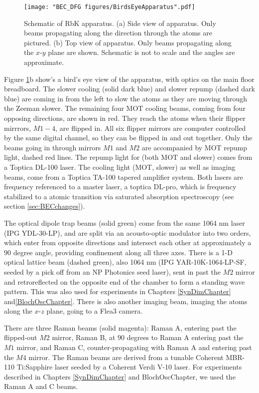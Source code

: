 \begin{figure}
	\texttt{[image: "BEC\_DFG figures/BirdsEyeApparatus".pdf]}
\caption[Schematic of RbK apparatus]{Schematic of RbK apparatus. (a) Side view of apparatus. Only beams propagating along the \ez{} direction through the atoms are pictured. (b) Top view of apparatus. Only beams propagating along the $x$-$y$ plane are shown. Schematic is not to scale and the angles are approximate.}
\label{fig:BirdsEyeApparatus}
\end{figure}

Figure \ref{fig:BirdsEyeApparatus}b show's a bird's eye view of the apparatus, with optics on the main floor breadboard. The slower cooling (solid dark blue) and slower repump (dashed dark blue) are coming in from the left to slow the atoms as they are moving through the Zeeman slower. The remaining four MOT cooling beams, coming from four opposing directions, are shown in red.  They reach the atoms when their flipper mirrrors, $M1-4$, are flipped in. All six flipper mirrors are computer controlled by the same digital channel, so they can be flipped in and out together. Only the beams going in through mirrors $M1$ and $M2$ are accompanied by MOT repump light, dashed red lines. The repump light for \Rb{} (both MOT and slower) comes from a Toptica DL-100 laser. The cooling light (MOT, slower) as well as imaging beams, come from a Toptica TA-100 tapered amplifier system. Both lasers are frequency referenced to a master laser, a toptica DL-pro, which is frequency stabilized to a \Rb{} atomic transition via saturated absorption spectroscopy (see section \ref{sec:BECchanges}).

The optical dipole trap beams (solid green) come from the same 1064 nm laser (IPG YDL-30-LP), and are split via an acousto-optic modulator into two orders, which enter from opposite directions and intersect each other at approximately a $90$ degree angle, providing confinement along all three axes.  There is a 1-D optical lattice beam (dashed green), also 1064 nm (IPG YAR-10K-1064-LP-SF, seeded by a pick off from an NP Photonics seed laser), sent in past the $M2$ mirror and retroreflected on the opposite end of the chamber to form a standing wave pattern. This was also used for experiments in Chapters \ref{SynDimChapter} and\ref{BlochOscChapter}. There is also another imaging beam, imaging the atoms along the $x$-$z$ plane, going to a Flea3 camera. 

There are three Raman beams (solid magenta): Raman A, entering past the flipped-out $M2$ mirror, Raman B, at $90$ degrees to Raman A entering past the $M1$ mirror, and Raman C, counter-propagating with Raman A and entering past the $M4$ mirror. The Raman beams are derived from a tunable Coherent MBR-110 Ti:Sapphire laser seeded by a Coherent Verdi V-10 laser. For experiments described in Chapters \ref{SynDimChapter} and {BlochOscChapter}, we used the Raman A and C beams.

